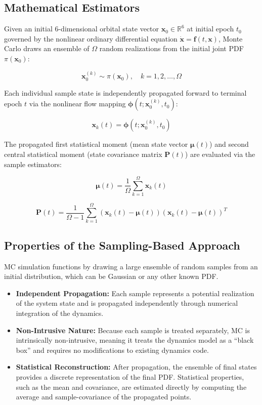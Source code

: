 \documentclass[
  letterpaper,
  DIV=11,
  numbers=noendperiod,
  oneside]{scrartcl}
\begin{document}
\subsection{Mathematical Estimators}\label{mathematical-estimators}

Given an initial 6-dimensional orbital state vector
\(\mathbf{x}_0 \in \mathbb{R}^6\) at initial epoch \(t_0\) governed by
the nonlinear ordinary differential equation
\(\dot{\mathbf{x}} = \mathbf{f}(t, \mathbf{x})\), Monte Carlo draws an
ensemble of \(\Omega\) random realizations from the initial joint PDF
\(\pi(\mathbf{x}_0)\):

\[
\mathbf{x}_0^{(k)} \sim \pi(\mathbf{x}_0), \quad k = 1, 2, \dots, \Omega
\]

Each individual sample state is independently propagated forward to
terminal epoch \(t\) via the nonlinear flow mapping
\(\boldsymbol{\phi}(t; \mathbf{x}_0^{(k)}, t_0)\):

\[
\mathbf{x}_k(t) = \boldsymbol{\phi}\left(t; \mathbf{x}_0^{(k)}, t_0\right)
\]

The propagated first statistical moment (mean state vector
\(\boldsymbol{\mu}(t)\)) and second central statistical moment (state
covariance matrix \(\mathbf{P}(t)\)) are evaluated via the sample
estimators:

\[
\boldsymbol{\mu}(t) = \frac{1}{\Omega} \sum_{k=1}^{\Omega} \mathbf{x}_k(t)
\]

\[
\mathbf{P}(t) = \frac{1}{\Omega - 1} \sum_{k=1}^{\Omega} \left( \mathbf{x}_k(t) - \boldsymbol{\mu}(t) \right) \left( \mathbf{x}_k(t) - \boldsymbol{\mu}(t) \right)^T
\]

\subsection{Properties of the Sampling-Based
Approach}\label{properties-of-the-sampling-based-approach}

MC simulation functions by drawing a large ensemble of random samples
from an initial distribution, which can be Gaussian or any other known
PDF.

\begin{itemize}
\item
  \textbf{Independent Propagation:} Each sample represents a potential
  realization of the system state and is propagated independently
  through numerical integration of the dynamics.
\item
  \textbf{Non-Intrusive Nature:} Because each sample is treated
  separately, MC is intrinsically non-intrusive, meaning it treats the
  dynamics model as a ``black box'' and requires no modifications to
  existing dynamics code.
\item
  \textbf{Statistical Reconstruction:} After propagation, the ensemble
  of final states provides a discrete representation of the final PDF.
  Statistical properties, such as the mean and covariance, are estimated
  directly by computing the average and sample-covariance of the
  propagated points.
\end{itemize}
\end{document}

